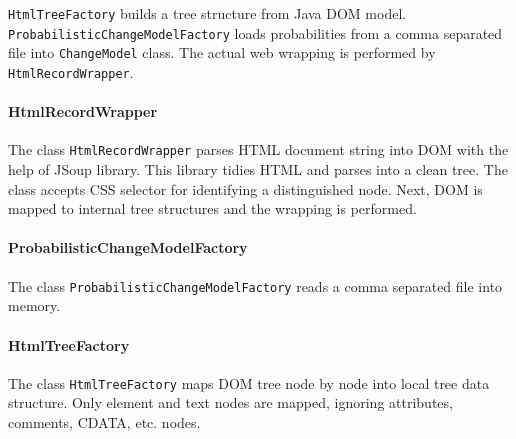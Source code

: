 \texttt{HtmlTreeFactory} builds a tree structure from Java DOM model. \texttt{ProbabilisticChangeModelFactory} loads probabilities from a comma separated file into \texttt{ChangeModel} class. The actual web wrapping is performed by \texttt{HtmlRecordWrapper}.


\paragraph{HtmlRecordWrapper} The class \texttt{HtmlRecordWrapper} parses HTML document string into DOM with the help of JSoup library. This library tidies HTML and parses into a clean tree. The class accepts CSS selector for identifying a distinguished node. Next, DOM is mapped to internal tree structures and the wrapping is performed.

\paragraph{ProbabilisticChangeModelFactory} The class \texttt{ProbabilisticChangeModelFactory} reads a comma separated file into memory.

\paragraph{HtmlTreeFactory} The class \texttt{HtmlTreeFactory} maps DOM tree node by node into local tree data structure. Only element and text nodes are mapped, ignoring attributes, comments, CDATA, etc. nodes.


